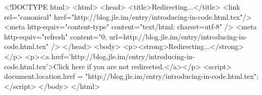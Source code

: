 <!DOCTYPE html>
<html>
<head>
<title>Redirecting...</title>
<link rel="canonical" href="http://blog.jle.im/entry/introducing-in-code.html.tex"/>
<meta http-equiv="content-type" content="text/html; charset=utf-8" />
<meta http-equiv="refresh" content="0; url=http://blog.jle.im/entry/introducing-in-code.html.tex" />
</head>
<body>
  <p><strong>Redirecting...</strong></p>
  <p><a href='http://blog.jle.im/entry/introducing-in-code.html.tex'>Click here if you are not redirected.</a></p>
  <script>
    document.location.href = "http://blog.jle.im/entry/introducing-in-code.html.tex";
  </script>
</body>
</html>
